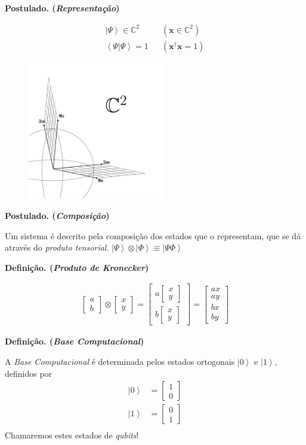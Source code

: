 \documentclass{beamer}
\newcommand{\postulado}[1]{%
	\textbf{Postulado. (\emph{#1})\\}
}
\newcommand{\definicao}[1]{%
	\textbf{Definição. (\emph{#1})\\}
}
\newcommand{\vetor}[2]{\ensuremath{
\left[\begin{matrix}
#1 \\
#2
\end{matrix}\right]
}
}
\newcommand{\vetorx}[4]{\ensuremath{
\left[\begin{matrix}
#1 \\
#2 \\
#3 \\
#4
\end{matrix}\right]
}
}
\newcommand{\ket}[1]{\ensuremath{\left|#1\right\rangle}}
\newcommand{\braket}[2]{\ensuremath{\left\langle#1|#2\right\rangle}}
\begin{document}
	\begin{frame}{\subsecname}
		\postulado{Representação}
		\begin{align*}
			\ket{\Psi} \in \mathbb{C}^2 && (\mathbf{x} \in \mathbb{C}^2)\\
			\braket{\Psi}{\Psi} = 1 && (\mathbf{x}^{\dagger} \mathbf{x} = 1)
		\end{align*}
		\vspace{-1cm}
		\begin{figure}[H]
			\includegraphics[width=6cm]{c2-sphere.pdf}
		\end{figure}
	\end{frame}

	\begin{frame}{\subsecname}
		\postulado{Composição}
		Um sistema é descrito pela composição dos estados que o representam, que se dá através do \emph{produto tensorial}.
		$\ket{\Psi} \otimes \ket{\Phi} \equiv \ket{\Psi\Phi}$
		
		\definicao{Produto de Kronecker}
		
		\begin{align*}
		\vetor{a}{b} \otimes \vetor{x}{y} = \vetor{a \vetor{x}{y}}{b \vetor{x}{y}} = \vetorx{ax}{ay}{bx}{by}
		\end{align*}
	\end{frame}
	
	\begin{frame}{\subsecname}
		\definicao{Base Computacional}
		A \emph{Base Computacional} é determinada pelos estados ortogonais $\ket{0}$ e $\ket{1}$, definidos por
		\begin{align*}
		\ket{0} &= \vetor{1}{0}\\
		\ket{1} &= \vetor{0}{1}\\
		\end{align*}
		Chamaremos estes estados de \textit{qubits}!
	\end{frame}
	
	
	
\end{document}
